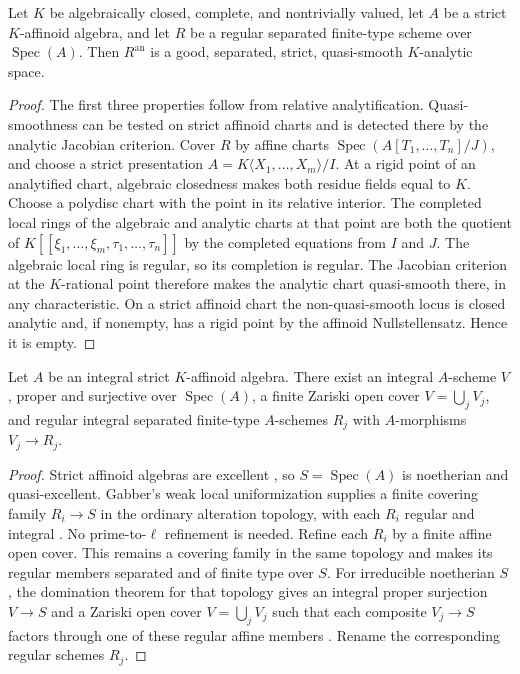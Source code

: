 \begin{lemma}\label{lem:supplied-p061-regular-analytification}
Let $K$ be algebraically closed, complete, and nontrivially valued, let $A$ be a strict $K$-affinoid algebra, and let $R$ be a regular separated finite-type scheme over $\operatorname{Spec}(A)$. Then $R^{\mathrm{an}}$ is a good, separated, strict, quasi-smooth $K$-analytic space.
\end{lemma}

\begin{proof}
The first three properties follow from relative analytification. Quasi-smoothness can be tested on strict affinoid charts and is detected there by the analytic Jacobian criterion. Cover $R$ by affine charts $\operatorname{Spec}(A[T_1,\ldots,T_n]/J)$, and choose a strict presentation $A=K\langle X_1,\ldots,X_m\rangle/I$. At a rigid point of an analytified chart, algebraic closedness makes both residue fields equal to $K$. Choose a polydisc chart with the point in its relative interior. The completed local rings of the algebraic and analytic charts at that point are both the quotient of $K[[\xi_1,\ldots,\xi_m,\tau_1,\ldots,\tau_n]]$ by the completed equations from $I$ and $J$. The algebraic local ring is regular, so its completion is regular. The Jacobian criterion at the $K$-rational point therefore makes the analytic chart quasi-smooth there, in any characteristic. On a strict affinoid chart the non-quasi-smooth locus is closed analytic and, if nonempty, has a rigid point by the affinoid Nullstellensatz. Hence it is empty.
\end{proof}

\begin{lemma}\label{lem:supplied-p061-regular-proper-cover}
Let $A$ be an integral strict $K$-affinoid algebra. There exist an integral $A$-scheme $V$, proper and surjective over $\operatorname{Spec}(A)$, a finite Zariski open cover $V=\bigcup_j V_j$, and regular integral separated finite-type $A$-schemes $R_j$ with $A$-morphisms $V_j\to R_j$.
\end{lemma}

\begin{proof}
Strict affinoid algebras are excellent \cite[proof of Theorem~1.3.1]{Berkovich15Finiteness}, so $S=\operatorname{Spec}(A)$ is noetherian and quasi-excellent. Gabber's weak local uniformization supplies a finite covering family $R_i\to S$ in the ordinary alteration topology, with each $R_i$ regular and integral \cite[Expos\'{e}~VII, Th\'{e}or\`{e}me~1.1, with $Z=\varnothing$]{ILO14}. No prime-to-$\ell$ refinement is needed. Refine each $R_i$ by a finite affine open cover. This remains a covering family in the same topology and makes its regular members separated and of finite type over $S$. For irreducible noetherian $S$, the domination theorem for that topology gives an integral proper surjection $V\to S$ and a Zariski open cover $V=\bigcup_jV_j$ such that each composite $V_j\to S$ factors through one of these regular affine members \cite[Expos\'{e}~II, Th\'{e}or\`{e}me~3.2.1, case $\ell=1$]{ILO14}. Rename the corresponding regular schemes $R_j$.
\end{proof}

